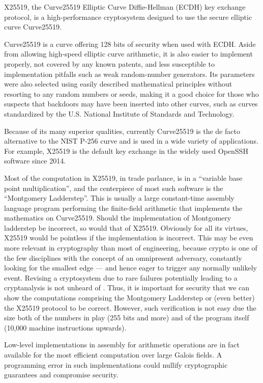 
X25519, the Curve25519 Elliptic Curve Diffie-Hellman (ECDH) key exchange
protocol, is a high-performance cryptosystem designed to use the
secure elliptic curve Curve25519.

Curve25519 is a curve offering 128 bits of security when used with
ECDH. Aside from allowing high-speed elliptic curve arithmetic, it is
also easier to implement properly, not covered by any known patents,
and less susceptible to implementation pitfalls such as weak
random-number generators. Its parameters were also selected using
easily described mathematical principles without resorting to any
random numbers or seeds, making it a good choice for those who
suspects that backdoors may have been inserted into other curves, such
as curves standardized by the U.S. National Institute of Standards and
Technology.

Because of its many superior qualities, currently Curve25519 is the de
facto alternative to the NIST P-256 curve and is used in a wide
variety of applications. For example, X25519 is the default key
exchange in the widely used OpenSSH software since 2014.

Most of the computation in X25519, in trade parlance, is in a
``variable base point multiplication'', and the centerpiece of most
such software is the ``Montgomery Ladderstep''. This is usually a
large constant-time assembly language program performing the
finite-field arithmetic that implements the mathematics on Curve25519.
Should the implementation of Montgomery ladderstep be incorrect, so
would that of X25519. Obviously for all its virtues, X25519 would be
pointless if the implementation is incorrect. This may be even more
relevant in cryptography than most of engineering, because crypto is
one of the few disciplines with the concept of an omnipresent
adversary, constantly looking for the smallest edge --- and hence
eager to trigger any normally unlikely event. Revising a cryptosystem
due to rare failures potentially leading to a cryptanalysis is not
unheard of .
Thus, it is important for security that we can show the computations
comprising the Montgomery Ladderstep or (even better) the X25519
protocol to be correct. However, such verification is not easy due
the size both of the numbers in play (255 bits and more) and of the
program itself (10,000 machine instructions upwards).

Low-level implementations in assembly for arithmetic operations
are in fact available for the most efficient computation over large
Galois fields. A programming error in such implementations could
nullify cryptographic guarantees and compromise security. 

